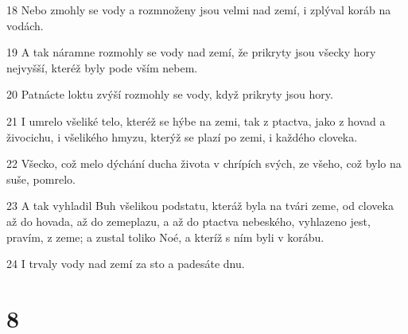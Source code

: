 \par 18 Nebo zmohly se vody a rozmnoženy jsou velmi nad zemí, i zplýval koráb na vodách.
\par 19 A tak náramne rozmohly se vody nad zemí, že prikryty jsou všecky hory nejvyšší, kteréž byly pode vším nebem.
\par 20 Patnácte loktu zvýší rozmohly se vody, když prikryty jsou hory.
\par 21 I umrelo všeliké telo, kteréž se hýbe na zemi, tak z ptactva, jako z hovad a živocichu, i všelikého hmyzu, kterýž se plazí po zemi, i každého cloveka.
\par 22 Všecko, což melo dýchání ducha života v chrípích svých, ze všeho, což bylo na suše, pomrelo.
\par 23 A tak vyhladil Buh všelikou podstatu, kteráž byla na tvári zeme, od cloveka až do hovada, až do zemeplazu, a až do ptactva nebeského, vyhlazeno jest, pravím, z zeme; a zustal toliko Noé, a kteríž s ním byli v korábu.
\par 24 I trvaly vody nad zemí za sto a padesáte dnu.

\chapter{8}

